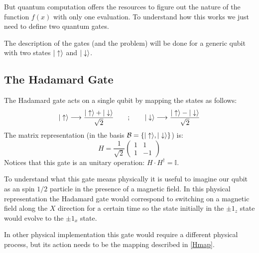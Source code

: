 But quantum computation offers the resources to figure out the nature of the function $f(x)$ with only one evaluation. To understand how this works we just need to define two quantum gates.

The description of the gates (and the problem) will be done for a generic qubit with two states $|\uparrow\rangle$ and $|\downarrow\rangle$.

\subsection{The Hadamard Gate}
The Hadamard gate acts on a single qubit by mapping the states as follows:
\begin{equation}
  |\uparrow\rangle \longrightarrow \frac{|\uparrow\rangle+|\downarrow\rangle}{\sqrt{2}}
  \quad\quad;\quad\quad
  |\downarrow\rangle \longrightarrow \frac{|\uparrow\rangle-|\downarrow\rangle}{\sqrt{2}}
\label{Hmap}
\end{equation}
The matrix representation (in the basis $\mathcal{B}=\left\{|\uparrow\rangle,|\downarrow\rangle\right\}$) is:
\begin{equation}
  H=\frac{1}{\sqrt{2}}\left(\begin{array}{cc}
  1 & 1 \\
  1 & -1
  \end{array}\right)
\label{hadamard}
\end{equation}
Notices that this gate is an unitary operation: $H\cdot H^{\dagger}=\mathbb{I}$.

To understand what this gate means physically it is useful to imagine our qubit as an spin $1/2$ particle in the presence of a magnetic field.
In this physical representation the Hadamard gate would correspond to switching on a magnetic field along the $X$ direction for a certain time so the state initially in the $\pm1_z$ state would evolve to the $\pm1_x$ state.

In other physical implementation this gate would require a different physical process, but its action needs to be the mapping described in \eqref{Hmap}.


